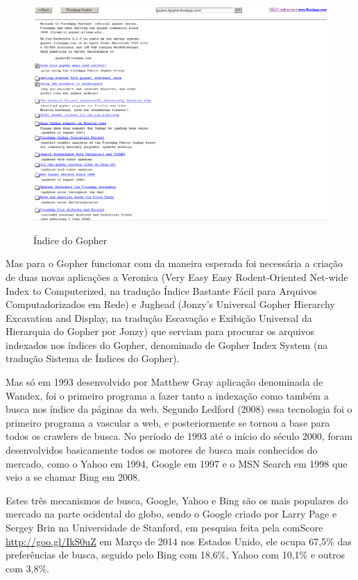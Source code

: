 \documentclass[
	12pt,				%
	openright,			%
	twoside,			%
	a4paper,			%
	english,			%
	french,				%
	spanish,			%
	brazil				%
	]{abntex2}
\begin{document}
\begin{figure}[hbtp]
\caption{Índice do Gopher}
\centering
\includegraphics[totalheight=0.5\textheight]{img/indice-gopher.png}
\label{who}
\end{figure}

Mas para o Gopher funcionar com da maneira esperada foi necessária a criação de duas novas aplicações a Veronica (Very Easy Easy Rodent-Oriented Net-wide Index to Computerized, na tradução Índice Bastante Fácil para Arquivos Computadorizados em Rede) e Jughead (Jonzy’s Universal Gopher Hierarchy Excavation and Display, na tradução Escavação e Exibição Universal da Hierarquia do Gopher por Jonzy) que serviam para procurar os arquivos indexados nos índices do Gopher, denominado de Gopher Index System (na tradução Sistema de Índices do Gopher).

Mas só em 1993 desenvolvido por Matthew Gray aplicação denominada de Wandex, foi o primeiro programa a fazer tanto a indexação como também a busca nos índice da páginas da web. Segundo Ledford (2008) essa tecnologia foi o primeiro programa a vascular a web, e posteriormente se tornou a base para todos os crawlers de busca. No período de 1993 até o início do século 2000, foram desenvolvidos basicamente todos os motores de busca mais conhecidos do mercado, como o Yahoo em 1994, Google em 1997 e o MSN Search em 1998 que veio a se chamar Bing em 2008.

Estes três mecanismos de busca, Google, Yahoo e Bing são os mais populares do mercado na parte ocidental do globo, sendo o Google criado por Larry Page e Sergey Brin na Universidade de Stanford, em pesquisa feita pela comScore \url{http://goo.gl/IkS0uZ} em Março de 2014 nos Estados Unido, ele ocupa 67,5\% das preferências de busca, seguido pelo Bing com 18,6\%, Yahoo com 10,1\% e outros com 3,8\%.
\end{document}
